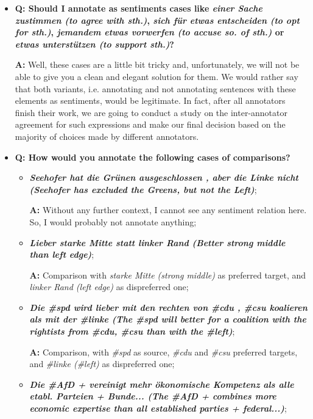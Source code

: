 \documentclass[11pt,a4paper]{article}
\begin{document}
\begin{itemize}
\item\textbf{Q: Should I annotate as sentiments cases like
  \textit{einer Sache zustimmen (to agree with sth.)}, \textit{sich
    f\"ur etwas entscheiden (to opt for sth.)}, \textit{jemandem
    etwas vorwerfen (to accuse so. of sth.)} or \textit{etwas
    unterst\"utzen (to support sth.)}?}

  \textbf{A:} Well, these cases are a little bit tricky and,
  unfortunately, we will not be able to give you a clean and elegant
  solution for them.  We would rather say that both variants,
  i.e. annotating and not annotating sentences with these elements as
  sentiments, would be legitimate.  In fact, after all annotators
  finish their work, we are going to conduct a study on the
  inter-annotator agreement for such expressions and make our final
  decision based on the majority of choices made by different
  annotators.

\item\textbf{Q: How would you annotate the following cases of comparisons?}
  \begin{itemize}
  \item\textbf{\textit{Seehofer hat die Gr\"unen ausgeschlossen , aber
      die Linke nicht (Seehofer has excluded the Greens, but not the
      Left)}};

    \textbf{A:} Without any further context, I cannot see any
    sentiment relation here.  So, I would probably not annotate
    anything;

  \item\textbf{\textit{Lieber starke Mitte statt linker Rand (Better
      strong middle than left edge)}};

    \textbf{A:} Comparison with \textit{starke Mitte (strong middle)}
    as preferred target, and \textit{linker Rand (left edge)} as
    dispreferred one;

  \item\textbf{\textit{Die \#spd wird lieber mit den rechten von \#cdu
      , \#csu koalieren als mit der \#linke (The \#spd will better for
      a coalition with the rightists from \#cdu, \#csu than with the
      \#left)}};

    \textbf{A:} Comparison, with \textit{\#spd} as source,
    \textit{\#cdu} and \textit{\#csu} preferred targets, and
    \textit{\#linke (\#left)} as dispreferred one;

  \item\textbf{\textit{Die \#AfD + vereinigt mehr \"okonomische
      Kompetenz als alle etabl. Parteien + Bunde... (The \#AfD +
      combines more economic expertise than all established parties +
      federal...)}};


\end{itemize}
\end{itemize}
\end{document}
